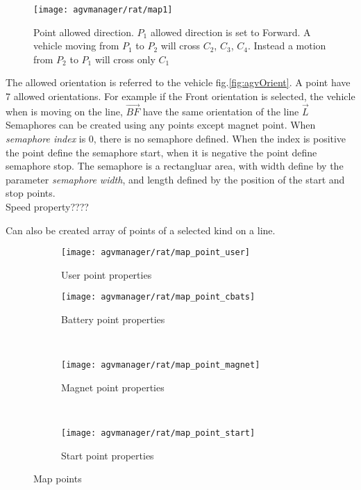 \begin{figure}[h]
	\centering\texttt{[image: agvmanager/rat/map1]}
	\caption{Point allowed direction. $P_{1}$ allowed direction is set to Forward. A vehicle moving from $P_{1}$ to $P_{2}$ will cross $C_{2}$, $C_{3}$, $C_{4}$. Instead a motion from $P_{2}$ to $P_{1}$ will cross only $C_{1}$ }
	\label{fig:map1}
\end{figure}

The allowed orientation is referred to the vehicle fig.\ref{fig:agvOrient}. A point have 7 allowed orientations. For example if the Front orientation is selected, the vehicle when is moving on the line, $\overrightarrow{BF}$ have the same orientation of the line $\overrightarrow{L}$\\

Semaphores can be created using any points except magnet point. When \textit{semaphore index} is 0, there is no semaphore defined. When the index is positive the point define the semaphore start, when it is negative the point define semaphore stop. The semaphore is a rectangluar area, with width define by the parameter \textit{semaphore width}, and length defined by the position of the start and stop points.\\

Speed property????

Can also be created array of points of a selected kind on a line.

\begin{figure}
	\centering
	\begin{subfigure}[b]{0.3\textwidth}
		\texttt{[image: agvmanager/rat/map\_point\_user]}
		\caption{User point properties}
		\label{fig:userpoint}
	\end{subfigure}
	\begin{subfigure}[b]{0.3\textwidth}
		\texttt{[image: agvmanager/rat/map\_point\_cbats]}
		\caption{Battery point properties}
		\label{fig:cbatpoint}
	\end{subfigure}
	~ %
	
	\begin{subfigure}[b]{0.3\textwidth}
		\texttt{[image: agvmanager/rat/map\_point\_magnet]}
		\caption{Magnet point properties}
		\label{fig:magnetpoint}
	\end{subfigure}
	~ %
	\begin{subfigure}[b]{0.3\textwidth}
		\texttt{[image: agvmanager/rat/map\_point\_start]}
		\caption{Start point properties}
		\label{fig:startpoint}
	\end{subfigure}
	
	\caption{Map points}\label{fig:animals}
\end{figure}

